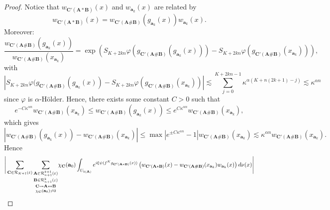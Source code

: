 \documentclass[a4paper]{article}
\theoremstyle{definition}
\begin{document}
\begin{proof}

Notice that $w_{\mathbf{C}'(\mathbf{A} * \mathbf{B})}(x)$ and $w_{\mathbf{a}_k}(x)$ are related by
$$ w_{\mathbf{C}'(\mathbf{A} * \mathbf{B})}(x) = w_{\mathbf{C}'(\mathbf{A} \# \mathbf{B})}(g_{\mathbf{a}_k}(x)) w_{\mathbf{a}_k}(x) .$$
Moreover:
$$  \frac{w_{\mathbf{C}'(\mathbf{A} \# \mathbf{B})}(g_{\mathbf{a}_k}(x))}{w_{\mathbf{C}'(\mathbf{A} \# \mathbf{B})}(x_{\mathbf{a}_k})} = \exp \left( S_{K+2kn}\varphi(g_{\mathbf{C}'(\mathbf{A} \# \mathbf{B})}(g_{\mathbf{a}_k}(x))) - S_{K+2kn}\varphi( g_{\mathbf{C}'(\mathbf{A} \# \mathbf{B})}(x_{\mathbf{a}_k})) \right) ,$$
with 
$$ \left| S_{K+2kn}\varphi(g_{\mathbf{C}'(\mathbf{A} \# \mathbf{B})}(g_{\mathbf{a}_k}(x)) - S_{K+2kn}\varphi( g_{\mathbf{C}'(\mathbf{A} \# \mathbf{B})}(x_{\mathbf{a}_k}))  \right| \lesssim \sum_{j=0}^{K+2kn-1} \kappa^{\alpha(K+n(2k+1) - j )} \lesssim \kappa^{\alpha n} $$
since $\varphi$ is $\alpha$-Hölder. Hence, there exists some constant $C>0$ such that
$$ e^{-C \kappa^{\alpha n}} w_{\mathbf{C}'(\mathbf{A} \# \mathbf{B})}(x_{\mathbf{a}_k}) \leq w_{\mathbf{C}'(\mathbf{A} \# \mathbf{B})}(g_{\mathbf{a}_k}(x)) \leq e^{C \kappa^{\alpha n}} w_{\mathbf{C}'(\mathbf{A} \# \mathbf{B})}(x_{\mathbf{a}_k}), $$
which gives
$$ \left| w_{\mathbf{C}'(\mathbf{A} \# \mathbf{B})}(g_{\mathbf{a}_k}(x)) -  w_{\mathbf{C}'(\mathbf{A} \# \mathbf{B})}(x_{\mathbf{a}_k})  \right| \leq \max\left| e^{\pm C \kappa^{\alpha n}} -1 \right|  w_{\mathbf{C}'(\mathbf{A} \# \mathbf{B})}(x_{\mathbf{a}_k}) \lesssim \kappa^{\alpha n} w_{\mathbf{C}'(\mathbf{A} \# \mathbf{B})}(x_{\mathbf{a}_k}) .$$
Hence
$$ \Bigg{|}  \sum_{\mathbf{C} \in \mathcal{R}_{K+1}(\varepsilon)} \underset{\chi_{\mathbf{C}}(\mathbf{a}_0) \neq 0}{\underset{\mathbf{C} \rightsquigarrow \mathbf{A} \leftrightarrow \mathbf{B}}{ \underset{ \mathbf{B} \in \mathcal{R}_{n+1}^k(\varepsilon)}{ \underset{\mathbf{A} \in \mathcal{R}_{n+1}^{k+1}(\varepsilon) }{ \sum}} }} \chi_{\mathbf{C}}(\mathbf{a}_0) \int_{U_{b(\mathbf{A})}} e^{i \xi \psi(f^K g_{\mathbf{C}'(\mathbf{A} * \mathbf{B})}(x))} \left(w_{\mathbf{C}'(\mathbf{A} * \mathbf{B})}(x) - w_{\mathbf{C}'(\mathbf{A} \# \mathbf{B})}(x_{\mathbf{a}_k}) w_{\mathbf{a}_k}(x) \right) d\nu(x) \Bigg{|}   $$


\end{proof}
\end{document}
